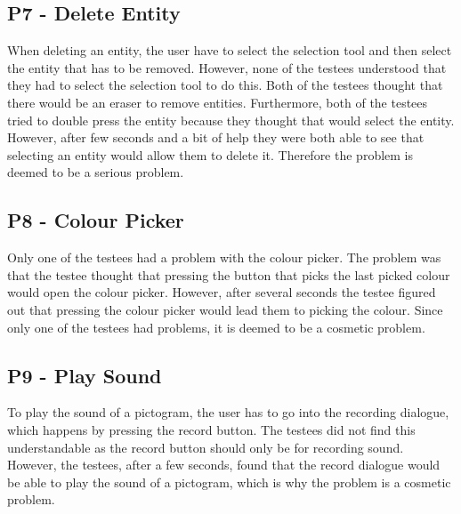 \subsection*{P7 - Delete Entity}
When deleting an entity, the user have to select the selection tool and then select the entity that has to be removed.
However, none of the testees understood that they had to select the selection tool to do this.
Both of the testees thought that there would be an eraser to remove entities.
Furthermore, both of the testees tried to double press the entity because they thought that would select the entity.
However, after few seconds and a bit of help they were both able to see that selecting an entity would allow them to delete it.
Therefore the problem is deemed to be a serious problem. 

\subsection*{P8 - Colour Picker}
Only one of the testees had a problem with the colour picker.
The problem was that the testee thought that pressing the button that picks the last picked colour would open the colour picker.
However, after several seconds the testee figured out that pressing the colour picker would lead them to picking the colour.
Since only one of the testees had problems, it is deemed to be a cosmetic problem.

\subsection*{P9 - Play Sound}
To play the sound of a pictogram, the user has to go into the recording dialogue, which happens by pressing the record button.
The testees did not find this understandable as the record button should only be for recording sound.
However, the testees, after a few seconds, found that the record dialogue would be able to play the sound of a pictogram, which is why the problem is a cosmetic problem.
